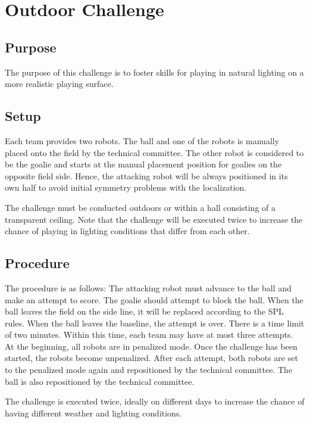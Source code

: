 \documentclass[12pt]{article}
\begin{document}
\newpage



\section{Outdoor Challenge}

\subsection{Purpose}
The purpose of this challenge is to foster skills for playing in natural lighting on a more realistic playing surface.

\subsection{Setup}
Each team provides two robots. The ball and one of the robots is manually placed onto the field by the technical committee. The other robot is considered to be the goalie and starts at the manual placement position for goalies on the opposite field side. Hence, the attacking robot will be always positioned in its own half to avoid initial symmetry problems with the localization.

The challenge must be conducted outdoors or within a hall consisting of a transparent ceiling. Note that the challenge will be executed twice to increase the chance of playing in lighting conditions that differ from each other.

\subsection{Procedure}
The procedure is as follows: The attacking robot must advance to the ball and make an attempt to score. The goalie should attempt to block the ball. When the ball leaves the field on the side line, it will be replaced according to the SPL rules. When the ball leaves the baseline, the attempt is over. There is a time limit of two minutes. Within this time, each team may have at most three attempts. At the beginning, all robots are in penalized mode. Once the challenge has been started, the robots become unpenalized. After each attempt, both robots are set to the penalized mode again and repositioned by the technical committee.  The ball is also repositioned by the technical committee.

The challenge is executed twice, ideally on different days to increase the chance of having different weather and lighting conditions.
\end{document}

